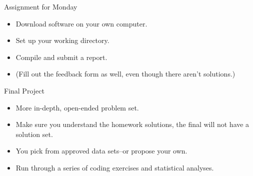 \documentclass[xcolor={dvipsnames}, handout]{beamer}
\begin{document}



\begin{frame}{Assignment for Monday}

\begin{itemize}
\item Download software on your own computer. \pause
\item Set up your working directory. \pause
\item Compile and submit a report.\pause
\item (Fill out the feedback form as well, even though there aren't solutions.) 
\end{itemize}

\end{frame}



\begin{frame}{Final Project}

\pause
\begin{itemize}
\item More in-depth, open-ended problem set. \pause
\item Make sure you understand the homework solutions, the final will not have a solution set. \pause
\item You pick from approved data sets--or propose your own. \pause
\item Run through a series of coding exercises and statistical analyses. 
\end{itemize}

\end{frame}


\end{document}
